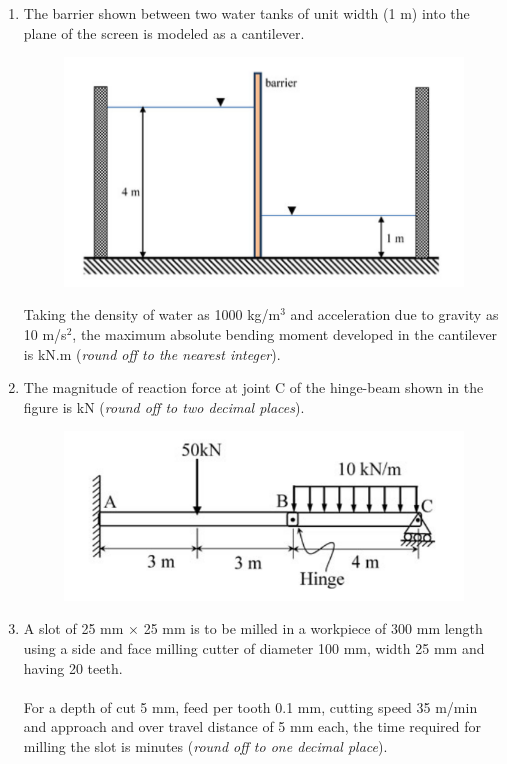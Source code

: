 \documentclass[12pt,onecolumn]{article}
\begin{document}
\begin{enumerate}
    \item The barrier shown between two water tanks of unit width (1 m) into the plane of the screen is modeled as a cantilever.
          \begin{figure}[H]
              \centering
              \includegraphics[scale=0.5]{q40}
              \label{fig:q40}
          \end{figure}
          Taking the density of water as 1000 kg/m$^3$ and acceleration due to gravity as 10 m/s$^2$, the maximum absolute bending moment developed in the cantilever is \underline{\hspace{2cm}} kN.m (\textit{round off to the nearest integer}).

    \item The magnitude of reaction force at joint C of the hinge-beam shown in the figure is \underline{\hspace{2cm}} kN (\textit{round off to two decimal places}).
          \begin{figure}[H]
              \centering
              \includegraphics[scale=0.5]{q41}
              \label{fig:q41}
          \end{figure}

    \item A slot of 25 mm $\times$ 25 mm is to be milled in a workpiece of 300 mm length using a side and face milling cutter of diameter 100 mm, width 25 mm and having 20 teeth.\\\\
          For a depth of cut 5 mm, feed per tooth 0.1 mm, cutting speed 35 m/min and approach and over travel distance of 5 mm each, the time required for milling the slot is \underline{\hspace{2cm}} minutes (\textit{round off to one decimal place}).


\end{enumerate}
\end{document}
